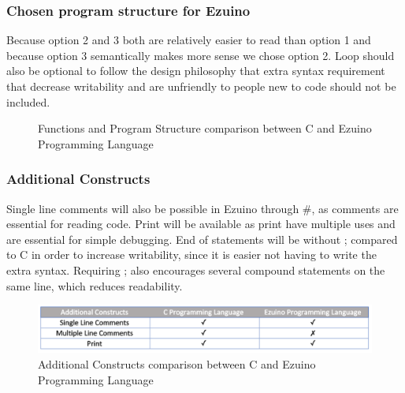 \subsubsection{Chosen program structure for Ezuino}
Because option 2 and 3 both are relatively easier to read than option 1 and because option 3 semantically makes more sense we chose option 2. Loop should also be optional to follow the design philosophy that extra syntax requirement that decrease writability and are unfriendly to people new to code should not be included. 
\begin{figure}[H]
\centering
{}
\caption{Functions and Program Structure comparison between C and Ezuino Programming Language}
\label{lf10}
\end{figure}
\subsubsection*{Additional Constructs}
Single line comments will also be possible in Ezuino through \#, as comments are essential for reading code. Print will be available as print have multiple uses and are essential for simple debugging. End of statements will be without ; compared to C in order to increase writability, since it is easier not having to write the extra syntax. Requiring ; also encourages several compound statements on the same line, which reduces readability. 
\begin{figure}[H]
\centering
\includegraphics[scale=0.60]{figures/language_features/langf09.png}
\caption{Additional Constructs comparison between C and Ezuino Programming Language}
\label{lf09}
\end{figure}